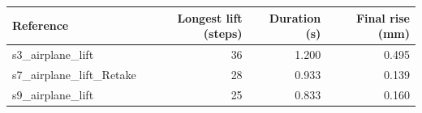 \begin{tabular}{lrrr}
\toprule
Reference & Longest lift (steps) & Duration (s) & Final rise (mm)\\
\midrule
s3_airplane_lift & 36 & 1.200 & 0.495\\
s7_airplane_lift_Retake & 28 & 0.933 & 0.139\\
s9_airplane_lift & 25 & 0.833 & 0.160\\
\bottomrule
\end{tabular}
